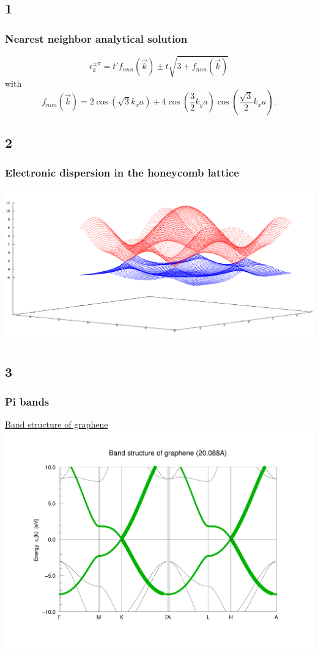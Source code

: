 \documentclass{beamer}
\begin{document}
	\subsection*{1}
		\begin{frame}
			\frametitle{Nearest neighbor analytical solution}
			\begin{equation}
				\epsilon_k^{\pm \pi} = t'f_{nnn}(\vec k) \pm t\sqrt{3 + f_{nnn}(\vec k)}
			\end{equation}
			with
			\begin{equation}
				f_{nnn}(\vec k) = 2\cos(\sqrt{3} k_x a ) + 4\cos(\frac{3}{2} k_y a)\cos(\frac{\sqrt{3}}{2}k_x a).
			\end{equation}			
		\end{frame}

	\subsection*{2}
		\begin{frame}
			\frametitle{Electronic dispersion in the honeycomb lattice}
			\centering
			\includegraphics[width=\textwidth]{figures/tightBinding3dplot.png}
		\end{frame}

	\subsection*{3}
		\begin{frame}
			\frametitle{Pi bands}
			\underline{Band structure of graphene}
			\includegraphics[width=\textwidth]{figures/tightBindingPiGraphene.pdf}
		\end{frame}
\end{document}
